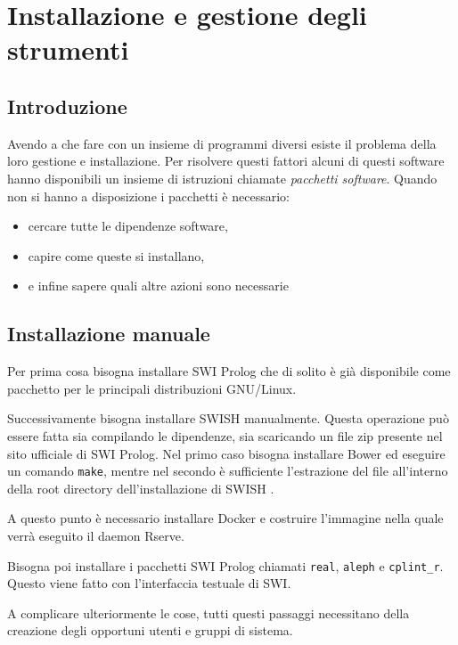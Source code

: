\documentclass[10pt,titlepage,twoside,a4paper]{report}
\begin{document}

\chapter{Installazione e gestione degli strumenti} 
\label{ch:installazione-e-gestione-degli-strumenti}

\section{Introduzione}
Avendo a che fare con un insieme di programmi diversi esiste il problema della 
loro gestione e installazione. Per risolvere questi fattori alcuni di questi 
software hanno disponibili un insieme di istruzioni chiamate \emph{pacchetti 
software}.
Quando non si hanno a disposizione i pacchetti è necessario:
\begin{itemize}
    \item cercare tutte le dipendenze software,
    \item capire come queste si installano,
    \item e infine sapere quali altre azioni sono necessarie
\end{itemize}

\section{Installazione manuale}
Per prima cosa bisogna installare SWI Prolog che di
solito è già disponibile come pacchetto per le principali distribuzioni 
GNU/Linux.

Successivamente bisogna installare SWISH manualmente. Questa operazione può 
essere fatta sia compilando le dipendenze, sia scaricando un file zip presente 
nel sito ufficiale di SWI Prolog. Nel primo caso bisogna installare Bower 
\cite{bower} ed eseguire un comando \texttt{make}, mentre nel secondo è 
sufficiente l'estrazione del file all'interno della root directory 
dell'installazione di SWISH \cite{swishManualInstallation}.

A questo punto è necessario installare Docker e costruire l'immagine nella 
quale verrà eseguito il daemon Rserve.

Bisogna poi installare i pacchetti SWI Prolog 
chiamati \texttt{real}, \texttt{aleph} e \texttt{cplint\_r}. Questo viene 
fatto con l'interfaccia testuale di SWI.

A complicare ulteriormente le cose, tutti questi passaggi necessitano della 
creazione degli opportuni utenti e gruppi di sistema.
\end{document}
